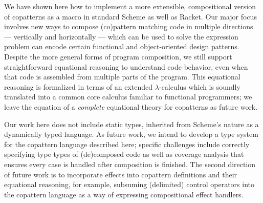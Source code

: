 We have shown here how to implement a more extensible, compositional version of copatterns as a macro in standard Scheme as well as Racket.
Our major focus involves new ways to compose (co)pattern matching code in multiple directions --- vertically and horizontally --- which can be used to solve the expression problem can encode certain functional and object-oriented design patterns.
Despite the more general forms of program composition, we still support straightforward equational reasoning to understand code behavior, even when that code is assembled from multiple parts of the program.
This equational reasoning is formalized in terms of an extended $\lambda$-calculus which is soundly translated into a common core calculus familiar to functional programmers;
we leave the equation of a \emph{complete} equational theory for copatterns as future work.

Our work here does not include static types, inherited from Scheme's nature as a dynamically typed language.
As future work, we intend to develop a type system for the copattern language described here; specific challenges include correctly specifying type types of (de)composed code as well as coverage analysis that ensures every case is handled after composition is finished.
The second direction of future work is to incorporate effects into copattern definitions and their equational reasoning, for example, subsuming (delimited) control operators into the copattern language as a way of expressing compositional effect handlers.


